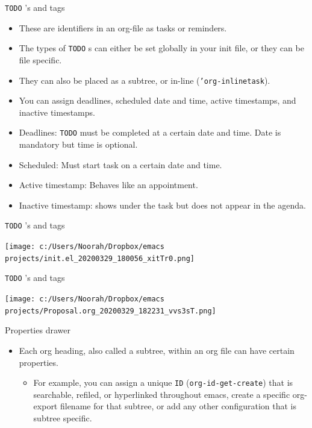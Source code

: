 \documentclass[presentation]{beamer}
\begin{document}
\begin{frame}[label={sec:org93dc8a8},fragile]{\texttt{TODO} 's and tags}
 \begin{itemize}
\item These are identifiers in an org-file as tasks or reminders.
\item The types of \texttt{TODO} s can either be set globally in your init file, or they can be file specific.
\item They can also be placed as a subtree, or in-line (\texttt{'org-inlinetask}).
\item You can assign deadlines, scheduled date and time, active timestamps, and inactive timestamps.
\end{itemize}

\begin{itemize}
\item \alert{Deadlines}: \texttt{TODO} must be completed at a certain date and time. Date is mandatory but time is optional.
\item \alert{Scheduled}: Must start task on a certain date and time.
\item \alert{Active timestamp}: Behaves like an appointment.
\item \alert{Inactive timestamp}: shows under the task but does not appear in the agenda.
\end{itemize}
\end{frame}

\begin{frame}[label={sec:orgf37dc3c},fragile]{\texttt{TODO} 's and tags}
 \begin{center}
\texttt{[image: c:/Users/Noorah/Dropbox/emacs projects/init.el\_20200329\_180056\_xitTr0.png]}
\end{center}
\end{frame}

\begin{frame}[label={sec:org205d431},fragile]{\texttt{TODO} 's and tags}
 \begin{center}
\texttt{[image: c:/Users/Noorah/Dropbox/emacs projects/Proposal.org\_20200329\_182231\_vvs3sT.png]}
\end{center}
\end{frame}

\begin{frame}[label={sec:orge338c7e},fragile]{Properties drawer}
 \begin{itemize}
\item Each org heading, also called a subtree, within an org file can have certain properties.
\begin{itemize}
\item For example, you can assign a unique \texttt{ID} (\texttt{org-id-get-create}) that is searchable, refiled, or hyperlinked throughout emacs, create a specific org-export filename for that subtree, or add any other configuration that is subtree specific.
\end{itemize}
\end{itemize}
\end{frame}
\end{document}
